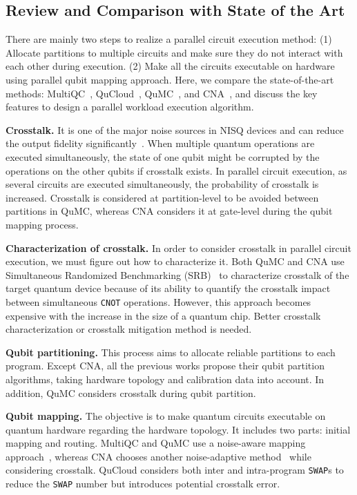 \documentclass[conference]{IEEEtran}
\begin{document}
\subsection{Review and Comparison with State of the Art}
There are mainly two steps to realize a parallel circuit execution method: (1) Allocate partitions to multiple circuits and make sure they do not interact with each other during execution. (2) Make all the circuits executable on hardware using parallel qubit mapping approach. Here, we compare the state-of-the-art methods: MultiQC~\cite{das2019case}, QuCloud~\cite{liuqucloud}, QuMC~\cite{niu2021enabling}, and CNA~\cite{ohkuracrosstalk}, and discuss the key features to design a parallel workload execution algorithm.

\textbf{Crosstalk.} It is one of the major noise sources in NISQ devices and can reduce the output fidelity significantly~\cite{murali2020software}. 
When multiple quantum operations are executed simultaneously, the state of one qubit might be corrupted by the operations on the other qubits if crosstalk exists. In parallel circuit execution, as several circuits are executed simultaneously, the probability of crosstalk is increased. Crosstalk is considered at partition-level to be avoided between partitions in QuMC, whereas CNA considers it at gate-level during the qubit mapping process. 

\textbf{Characterization of crosstalk.} In order to consider crosstalk in parallel circuit execution, we must figure out how to characterize it. Both QuMC and CNA use Simultaneous Randomized Benchmarking (SRB)~\cite{gambetta2012characterization} to characterize crosstalk of the target quantum device because of its ability to quantify the crosstalk impact between simultaneous \texttt{CNOT} operations. However, this approach becomes expensive with the increase in the size of a quantum chip. Better crosstalk characterization or crosstalk mitigation method is needed.

\textbf{Qubit partitioning.} This process aims to allocate reliable partitions to each program. Except CNA, all the previous works propose their qubit partition algorithms, taking hardware topology and calibration data into account. In addition, QuMC considers crosstalk during qubit partition. 

\textbf{Qubit mapping.} The objective is to make quantum circuits executable on quantum hardware regarding the hardware topology. It includes two parts: initial mapping and routing. MultiQC and QuMC use a noise-aware mapping approach~\cite{niu2020hardware}, whereas CNA chooses another noise-adaptive method~\cite{murali2019noise} while considering crosstalk. QuCloud considers both inter and intra-program \texttt{SWAP}s to reduce the \texttt{SWAP} number but introduces potential crosstalk error. 
\end{document}
